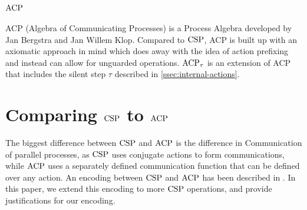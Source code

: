 \documentclass[../hons_project.tex]{subfiles}
\begin{document}
\section{\texorpdfstring{$\mathrm{ACP}$}{acp}}
ACP (Algebra of Communicating Processes) \citep{bergstraProcessAlgebraSynchronous1984} is a Process Algebra developed by Jan Bergstra and Jan Willem Klop. Compared to $\mathrm{CSP}$, ACP is built up with an axiomatic approach in mind which does away with the idea of action prefixing and instead can allow for unguarded operations. $\mathrm{ACP}_{\tau}$ \citep{bergstraACPtUniversalAxiom1989} is an extension of ACP that includes the silent step $\tau$ described in \cref{ssec:internal-actions}.

\section{Comparing \texorpdfstring{$\mathrm{CSP}$}{CSP} to \texorpdfstring{$\mathrm{ACP}$}{ACP}}
The biggest difference between $\mathrm{CSP}$ and $\mathrm{ACP}$ is the difference in Communication of parallel processes, as $\mathrm{CSP}$ uses conjugate actions to form communications, while $\mathrm{ACP}$ uses a separately defined communication function that can be defined over any action. An encoding between $\mathrm{CSP}$ and $\mathrm{ACP}$ has been described in \cite{vanglabbeekTheoryEncodingsExpressiveness2024}. In this paper, we extend this encoding to more $\mathrm{CSP}$ operations, and provide justifications for our encoding.


\end{document}

